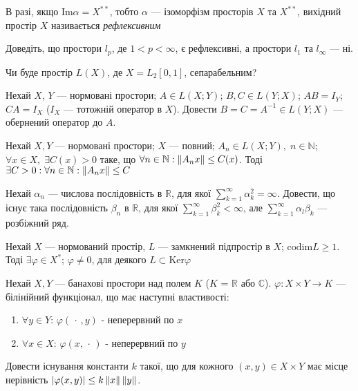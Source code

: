 \begin{theory}
    В разі, якщо $\mathrm{Im}\alpha = X^{**}$, тобто $\alpha$ --- ізоморфізм просторів $X$ та $X^{**}$,
    вихідний простір $X$ називається \emph{рефлексивним}
\end{theory}

\begin{exercise}
    Доведіть, що простори  $l_p$, де $1<p<\infty$, є рефлексивні, а простори $l_1$ та $l_\infty$ --- ні.
\end{exercise}

\begin{exercise}
    Чи буде простір $L(X)$, де $X=L_2[0,1]$, сепарабельним?
\end{exercise}

\begin{exercise}
    Нехай $X$, $Y$ --- нормовані простори; $A \in L(X;Y)$; $B, C \in L(Y;X)$;
    $AB = I_Y$; $CA = I_X$ ($I_X$ --- тотожній оператор в $X$).
    Довести $B = C = A^{-1} \in L(Y; X)$ --- обернений оператор до $A$.
\end{exercise}

\begin{theory}
    \begin{theorem}
        Нехай $X, Y$ --- нормовані простори; $X$ --- повний; $A_n \in L(X;Y),\; n\in \mathbb{N}$;
        $\forall x \in X, \; \exists C(x) > 0$ таке, що $\forall n \in \mathbb{N}: \left\lVert A_n x\right\rVert \leq C(x)$.
        Тоді $\exists C>0: \forall n \in \mathbb{N}: \left\lVert A_n x\right\rVert \leq C$
    \end{theorem}
\end{theory}

\begin{exercise}
    Нехай $\alpha_n$ --- числова послідовність в $\mathbb{R}$, для якої 
    $\sum^\infty_{k=1} \alpha^2_k =\infty$. Довести, що існує така послідовність 
    $\beta_n$ в $\mathbb{R}$, для якої $\sum^\infty_{k=1} \beta^2_k < \infty$, 
    але $\sum^\infty_{k=1} \alpha_l\beta_k$ --- розбіжний ряд.
\end{exercise}

\begin{exercise}
    Нехай $X$ --- нормований простір, $L$ --- замкнений підпростір в $X$; $\mathrm{codim}L \geq 1$.
    Тоді $\exists \varphi \in X^*$; $\varphi \neq 0$, для деякого $L \subset \mathrm{Ker}\varphi$
\end{exercise}

\begin{exercise}
    Нехай $X, Y$ --- банахові простори над полем $K$ ($K$ = $\mathbb{R}$ або $\mathbb{C}$).
    $\varphi: X \times Y \rightarrow K$ --- білінійний функціонал, що має наступні властивості:
    \begin{enumerate}[label=\ukr*)]
        \item $\forall y \in Y$: $\varphi(\,\cdot\,, y)$ - неперервний по $x$
        \item $\forall x \in X$: $\varphi(x, \,\cdot\,)$ - неперервний по $y$
    \end{enumerate}
    Довести існування константи $k$ такої, що для кожного $(x,y) \in X \times Y$ має місце нерівність
    $|\varphi(x,y)| \leq k \left\lVert x\right\rVert \left\lVert y\right\rVert$.
\end{exercise}